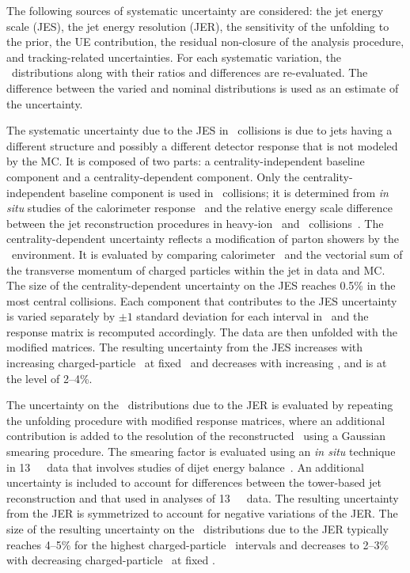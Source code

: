 
The following sources of systematic uncertainty are considered:
the jet energy scale (JES), the jet energy resolution (JER), 
the sensitivity of the  unfolding to the prior, the UE contribution, the residual non-closure of the analysis procedure, and tracking-related uncertainties.
For each systematic variation, the \Dptr\ distributions along with their ratios and differences are re-evaluated. The difference between the varied and nominal distributions is used as an estimate of the uncertainty.

The systematic uncertainty due to the JES in \PbPb\ collisions is due to jets having a different structure and possibly a different detector response that is not modeled by the MC. It is composed of two parts: 
a centrality-independent baseline component and a centrality-dependent component. Only the centrality-independent baseline component is used in \pp\ collisions; 
it is determined from \textit{in situ} studies of the calorimeter
response~\cite{Aad:2011he,HIjesnote,Aaboud:2017jcu} and the relative energy scale difference between the jet reconstruction procedures in heavy-ion~\cite{HIjesnote} and \pp\ collisions~\cite{Aad:2014bia}. The centrality-dependent uncertainty reflects a modification of parton showers by the \PbPb\ environment. It is evaluated by comparing calorimeter \ptjet\ and the vectorial sum of the transverse momentum of charged particles within the jet in data and MC. The size of the centrality-dependent uncertainty on the JES reaches 0.5\% in the most central collisions. Each component that contributes to the JES uncertainty is varied separately by $\pm1$ standard deviation for each interval in \ptjet\ and the response matrix is recomputed accordingly. The data are then unfolded with the modified matrices. The resulting uncertainty from the JES increases with increasing charged-particle \pT\ at fixed \ptjet\ and decreases with increasing \ptjet, and is at the level of 2--4\%.

The uncertainty on the \Dptr\ distributions due to the JER is evaluated by repeating the unfolding procedure with modified response matrices, where an additional contribution is added to the resolution of the reconstructed \ptjet\ using a Gaussian smearing procedure. The smearing factor is evaluated using an \textit{in situ} technique in 13~\TeV\ \pp\ data that involves studies of dijet energy balance~\cite{Aad:2012ag,JERConfNote}. An additional uncertainty is included to account for differences between the tower-based jet reconstruction and that used in analyses of 13~\TeV\ \pp\ data. The resulting uncertainty from the JER is symmetrized to account for negative variations of the JER.  The size of the resulting uncertainty on the \Dptr\ distributions due to the JER typically reaches 4--5\% for the highest charged-particle \pT\ intervals and decreases to 2--3\% with decreasing charged-particle \pT\ at fixed \ptjet.


